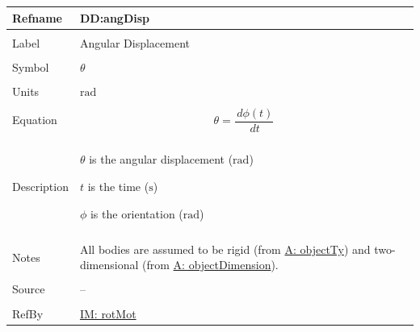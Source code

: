 \documentclass[12pt]{article}
\begin{document}
\vspace{\baselineskip}
\noindent
\begin{minipage}{\textwidth}
\begin{tabular}{>{\raggedright}p{}>{\raggedright\arraybackslash}p{}}
\toprule \textbf{Refname} & \textbf{DD:angDisp}
\label{DD:angDisp}
\\ \midrule \\
Label & Angular Displacement
        
\\ \midrule \\
Symbol & $θ$
         
\\ \midrule \\
Units & ${\text{rad}}$
        
\\ \midrule \\
Equation & \begin{displaymath}
           θ=\frac{\,dϕ\left(t\right)}{\,dt}
           \end{displaymath}
\\ \midrule \\
Description & \begin{symbDescription}
              \item{$θ$ is the angular displacement (${\text{rad}}$)}
              \item{$t$ is the time (${\text{s}}$)}
              \item{$ϕ$ is the orientation (${\text{rad}}$)}
              \end{symbDescription}
\\ \midrule \\
Notes & All bodies are assumed to be rigid (from \hyperref[assumpOT]{A: objectTy}) and two-dimensional (from \hyperref[assumpOD]{A: objectDimension}).
        
\\ \midrule \\
Source & --
         
\\ \midrule \\
RefBy & \hyperref[IM:rotMot]{IM: rotMot}
        
\\ \bottomrule
\end{tabular}
\end{minipage}
\end{document}
